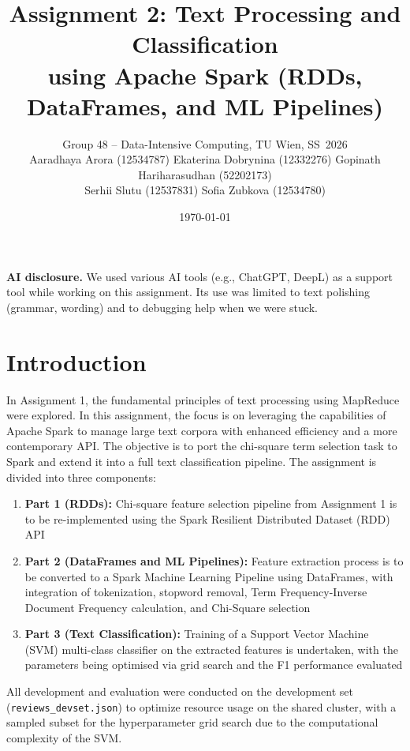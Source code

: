 \documentclass[11pt,a4paper]{article}
\title{\vspace{-1cm}Assignment 2: Text Processing and Classification\\
       \large using Apache Spark (RDDs, DataFrames, and ML Pipelines)}
\author{
Group 48 -- Data-Intensive Computing, TU Wien, SS~2026\\[2pt]
\small
Aaradhaya Arora (12534787) \quad
Ekaterina Dobrynina (12332276) \quad
Gopinath Hariharasudhan (52202173) \\[1pt]
\small
Serhii Slutu (12537831) \quad
Sofia Zubkova (12534780)
}
\date{\today}
\begin{document}
\maketitle

\vspace{-0.4cm}

\noindent\textbf{AI disclosure.}
We used various AI tools (e.g., ChatGPT, DeepL) as a support tool while working on this
assignment. Its use was limited to text polishing (grammar, wording) and to
debugging help when we were stuck.

\vspace{0.2cm}

\section{Introduction}

In Assignment 1, the fundamental principles of text processing using MapReduce were explored. In this assignment, the focus is on leveraging the capabilities of Apache Spark to manage large text corpora with enhanced efficiency and a more contemporary API. The objective is to port the chi-square term selection task to Spark and extend it into a full text classification pipeline. 
The assignment is divided into three components:
\begin{enumerate}
    \item \textbf{Part 1 (RDDs):} Chi-square feature selection pipeline from Assignment 1 is to be re-implemented using the Spark Resilient Distributed Dataset (RDD) API
    \item \textbf{Part 2 (DataFrames and ML Pipelines):} Feature extraction process is to be converted to a Spark Machine Learning Pipeline using DataFrames, with integration of tokenization, stopword removal, Term Frequency-Inverse Document Frequency calculation, and Chi-Square selection
    \item \textbf{Part 3 (Text Classification):} Training of a Support Vector Machine (SVM) multi-class classifier on the extracted features is undertaken, with the parameters being optimised via grid search and the F1 performance evaluated
\end{enumerate}

All development and evaluation were conducted on the development set (\texttt{reviews\_devset.json}) to optimize resource usage on the shared cluster, with a sampled subset for the hyperparameter grid search due to the computational complexity of the SVM.
\end{document}
